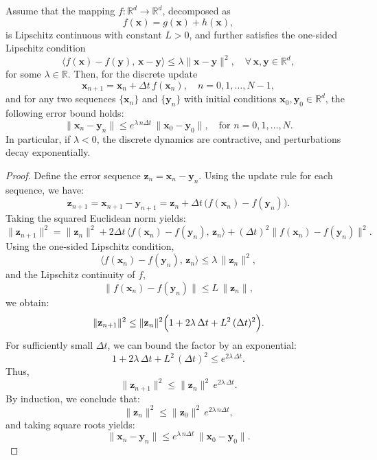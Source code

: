 \begin{theorem}
\label{thm:discrete_contractivity}
Assume that the mapping $f:\mathbb{R}^d \to \mathbb{R}^d$, decomposed as
\[
f(\mathbf{x}) = g(\mathbf{x}) + h(\mathbf{x}),
\]
is Lipschitz continuous with constant $L > 0$, and further satisfies the one-sided Lipschitz condition
\[
\langle f(\mathbf{x}) - f(\mathbf{y}),\, \mathbf{x} - \mathbf{y} \rangle \le \lambda \|\mathbf{x} - \mathbf{y}\|^2, \quad \forall\, \mathbf{x},\mathbf{y}\in \mathbb{R}^d,
\]
for some $\lambda \in \mathbb{R}$. Then, for the discrete update
\[
\mathbf{x}_{n+1} = \mathbf{x}_n + \Delta t\, f(\mathbf{x}_n), \quad n = 0,1,\dots,N-1,
\]
and for any two sequences $\{\mathbf{x}_n\}$ and $\{\mathbf{y}_n\}$ with initial conditions $\mathbf{x}_0,\mathbf{y}_0\in\mathbb{R}^d$, the following error bound holds:
\[
\|\mathbf{x}_n - \mathbf{y}_n\| \le e^{\lambda\, n\Delta t}\, \|\mathbf{x}_0 - \mathbf{y}_0\|, \quad \text{for } n=0,1,\dots,N.
\]
In particular, if $\lambda < 0$, the discrete dynamics are contractive, and perturbations decay exponentially.
\end{theorem}

\begin{proof}
Define the error sequence $\mathbf{z}_n = \mathbf{x}_n - \mathbf{y}_n$. Using the update rule for each sequence, we have:
\[
\mathbf{z}_{n+1} = \mathbf{x}_{n+1} - \mathbf{y}_{n+1} = \mathbf{z}_n + \Delta t\, \bigl( f(\mathbf{x}_n) - f(\mathbf{y}_n) \bigr).
\]
Taking the squared Euclidean norm yields:
\[
\|\mathbf{z}_{n+1}\|^2 = \|\mathbf{z}_n\|^2 + 2\Delta t\, \langle f(\mathbf{x}_n) - f(\mathbf{y}_n),\, \mathbf{z}_n \rangle + (\Delta t)^2 \| f(\mathbf{x}_n) - f(\mathbf{y}_n) \|^2.
\]
Using the one-sided Lipschitz condition,
\[
\langle f(\mathbf{x}_n) - f(\mathbf{y}_n),\, \mathbf{z}_n \rangle \le \lambda\, \|\mathbf{z}_n\|^2,
\]
and the Lipschitz continuity of $f$,
\[
\|f(\mathbf{x}_n) - f(\mathbf{y}_n)\| \le L\, \|\mathbf{z}_n\|,
\]
we obtain:
\[
\|\mathbf{z}_{n+1}\|^2 \le \|\mathbf{z}_n\|^2 \Bigl( 1 + 2\lambda\, \Delta t + L^2\,(\Delta t)^2 \Bigr).
\]
For sufficiently small $\Delta t$, we can bound the factor by an exponential:
\[
1 + 2\lambda\, \Delta t + L^2\,(\Delta t)^2 \le e^{2\lambda\, \Delta t}.
\]
Thus,
\[
\|\mathbf{z}_{n+1}\|^2 \le \|\mathbf{z}_n\|^2\, e^{2\lambda\, \Delta t}.
\]
By induction, we conclude that:
\[
\|\mathbf{z}_n\|^2 \le \|\mathbf{z}_0\|^2\, e^{2\lambda\, n\Delta t},
\]
and taking square roots yields:
\[
\|\mathbf{x}_n - \mathbf{y}_n\| \le e^{\lambda\, n\Delta t}\, \|\mathbf{x}_0 - \mathbf{y}_0\|.
\]
\end{proof}

